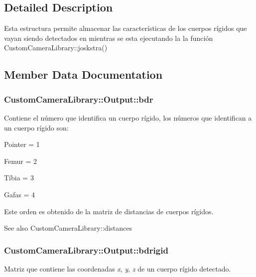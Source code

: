\subsection{Detailed Description}
Esta estructura permite almacenar las características de los cuerpos rígidos que vayan siendo detectados en mientras se esta ejecutando la la función Custom\+Camera\+Library\+::joskstra() 

\subsection{Member Data Documentation}
\subsubsection[{\texorpdfstring{bdr}{bdr}}]{\setlength{\rightskip}{0pt plus 5cm}Custom\+Camera\+Library\+::\+Output\+::bdr}\hypertarget{struct_custom_camera_library_1_1_output_a035a9b6775bc3cd9637f8b67018f628b}{}\label{struct_custom_camera_library_1_1_output_a035a9b6775bc3cd9637f8b67018f628b}
Contiene el número que identifica un cuerpo rígido, los números que identifican a un cuerpo rígido son\+:
\begin{DoxyItemize}
\item Pointer = 1
\item Femur = 2
\item Tíbia = 3
\item Gafas = 4

Este orden es obtenido de la matriz de distancias de cuerpos rígidos. \begin{DoxySeeAlso}{See also}
Custom\+Camera\+Library\+::distances 
\end{DoxySeeAlso}

\end{DoxyItemize}
\subsubsection[{\texorpdfstring{bdrigid}{bdrigid}}]{\setlength{\rightskip}{0pt plus 5cm}Custom\+Camera\+Library\+::\+Output\+::bdrigid}\hypertarget{struct_custom_camera_library_1_1_output_ae2017d51295ddb45390dc715b4815b29}{}\label{struct_custom_camera_library_1_1_output_ae2017d51295ddb45390dc715b4815b29}
Matriz que contiene las coordenadas {\itshape x}, {\itshape y}, {\itshape z} de un cuerpo rígido detectado. 
